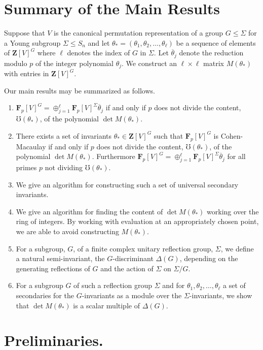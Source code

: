 \documentclass[12pt]{amsart}
\renewcommand{\leq}{\leqslant}
\newcommand{\ZZ}{\mathbf{Z}} %
\newcommand{\FF}{\mathbf{F}} %
\newcommand{\ZZ}{\mathbb{Z}} %
\newcommand{\FF}{\mathbb{F}} %
\newcommand{\Sn}{{S_n}}
\theoremstyle{definition}
\newcommand{\btheta}{{\overline{\theta}}}
\newcommand{\bth}{{{\theta_*}}} %
\begin{document}
\section{Summary of the Main Results}\label{summary}
 Suppose that $V$ is the canonical permutation representation of a group $G \leq \Sigma$ for a Young subgroup $\Sigma \leq \Sn$ and let
$\bth=(\theta_1,\theta_2,\dots,\theta_\ell)$ be a sequence of elements of $\ZZ[V]^G$ where $\ell$ denotes the index of $G$ in $\Sigma$.  
Let $\btheta_j$ denote the reduction modulo $p$ of the integer polynomial $\theta_j$.
We construct an $\ell\times\ell$ matrix $M(\bth)$ with entries in $\ZZ[V]^G$.  

Our main results may be summarized as follows.
\begin{enumerate}
   \item  
   $\FF_p[V]^G = \oplus_{j=1}^\ell \FF_p[V]^{\Sigma} \btheta_j$
   if and only if $p$ does not divide the content, $\mho(\bth)$, of 
   the polynomial $\det M(\bth)$.
 \item There exists a set of invariants $\bth \in \ZZ[V]^G$ such that
 $\FF_p[V]^G$ is Cohen-Macaulay if and only if $p$ does not divide 
 the content, $\mho(\bth)$, of the polynomial $\det M(\bth)$.
 Furthermore $\FF_p[V]^G = \oplus_{j=1}^\ell \FF_p[V]^{\Sigma} \btheta_j$
 for all primes $p$ not dividing $\mho(\bth)$.
  \item We give an algorithm for constructing such a set of universal secondary invariants.
 \item We give an algorithm for finding the content of 
  $\det M(\bth)$ working over the ring of integers.  By working with evaluation at an appropriately chosen point, we are able to avoid 
  constructing $M(\bth)$.
  \item For a subgroup, $G$, of a finite complex unitary reflection group, $\Sigma$,
  we define a natural semi-invariant, the $G$-discriminant $\Delta(G)$, depending on the generating reflections 
  of $G$ and the action of $\Sigma$ on $\Sigma/G$.
  \item  For a subgroup $G$ of such a reflection group $\Sigma$ and
  for $\theta_1,\theta_2,\dots,\theta_\ell$ a set of secondaries
  for the $G$-invariants as a module over the $\Sigma$-invariants,
  we show that $\det M(\bth)$ is a scalar multiple of $\Delta(G)$. 
\end{enumerate}

  

\section{ Preliminaries.} \label{preliminaries}
\end{document}
